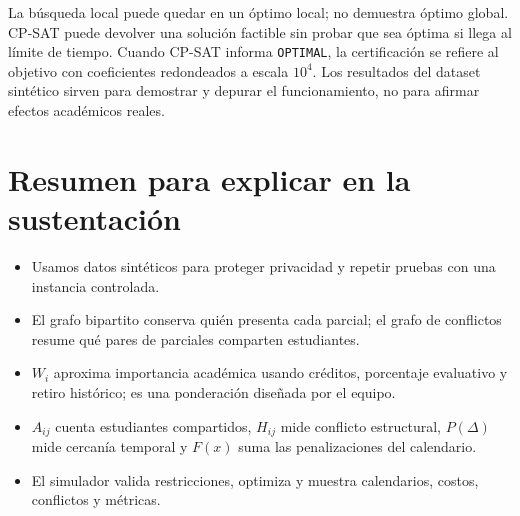 \documentclass[11pt,a4paper]{article}
\begin{document}
La búsqueda local puede quedar en un óptimo local; no demuestra óptimo global. CP-SAT puede devolver una solución factible sin probar que sea óptima si llega al límite de tiempo. Cuando CP-SAT informa \texttt{OPTIMAL}, la certificación se refiere al objetivo con coeficientes redondeados a escala $10^4$. Los resultados del dataset sintético sirven para demostrar y depurar el funcionamiento, no para afirmar efectos académicos reales.

\section{Resumen para explicar en la sustentación}
\begin{itemize}[leftmargin=*]
    \item Usamos datos sintéticos para proteger privacidad y repetir pruebas con una instancia controlada.
    \item El grafo bipartito conserva quién presenta cada parcial; el grafo de conflictos resume qué pares de parciales comparten estudiantes.
    \item $W_i$ aproxima importancia académica usando créditos, porcentaje evaluativo y retiro histórico; es una ponderación diseñada por el equipo.
    \item $A_{ij}$ cuenta estudiantes compartidos, $H_{ij}$ mide conflicto estructural, $P(\Delta)$ mide cercanía temporal y $F(x)$ suma las penalizaciones del calendario.
    \item El simulador valida restricciones, optimiza y muestra calendarios, costos, conflictos y métricas.
\end{itemize}
\end{document}
